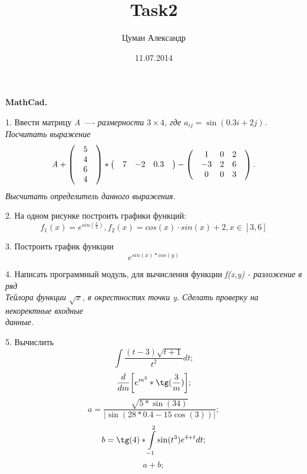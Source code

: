 \documentclass[11pt]{article}
\title{Task2}
\author{Цуман Александр}
\date{11.07.2014}
\begin{document}
\thispagestyle{empty}

\begin{center}\bf MathCad. \rm\end{center}

1. Ввести матрицу \it A \rm —- размерности $3 \times 4$, где $a_{ij} = \sin (0.3i+2j)$. Посчитать выражение
\[ \it A \rm + 
\begin{pmatrix} 
	& 5 & \\ 
	& 4 & \\ 
	& 6 & \\ 
	& 4 & 
\end{pmatrix}
	\ast 
\begin{pmatrix}
	& 7 & -2 & 0.3 &
\end{pmatrix}
	-
\begin{pmatrix}
	& 1 & 0 & 2 &\\
	& -3 & 2 & 6 &\\
	& 0 & 0 & 3 &\\
\end{pmatrix}
	.
\]
Высчитать определитель данного выражения.

2. На одном рисунке построить графики функций:
\begin {equation*}
	f_1(x)=e^{sin(\frac{x}{2})},
	f_2(x)=cos(x)\cdot sin(x)+2, x\in[3,6]
\end {equation*}

3. Построить график функции
\begin {equation*}
	e^{sin(x) \ast cos(y)}
\end {equation*}


4. Написать программный модуль, для вычисления функции \it f(x,y) \rm - разложение в ряд 
	\\Тейлора функции $ \sqrt{x} $, в окрестностях точки y. Сделать проверку на некоректные входные 
	\\данные.	

5. Вычислить
\begin {equation*}
	\int \frac{(t-3)\sqrt{t+1}}{t^2}dt;
\end {equation*}
\begin {equation*}
	\frac{d}{dm}\biggl[e^{m^2} \ast \tg(\frac{3}{m})\biggr];
\end {equation*}
\begin {equation*}
	a=\frac{\sqrt{5 \ast \sin(34)}}{|\sin(28 \ast 0.4 - 15\cos(3))|};
\end {equation*}
\begin {equation*}
	b=\tg(4) \ast \int\limits_{-1}^2 \sin(t^3)e^{4+t}dt;
\end {equation*}
\begin {equation*}
	a+b;
\end {equation*}
\end{document}
